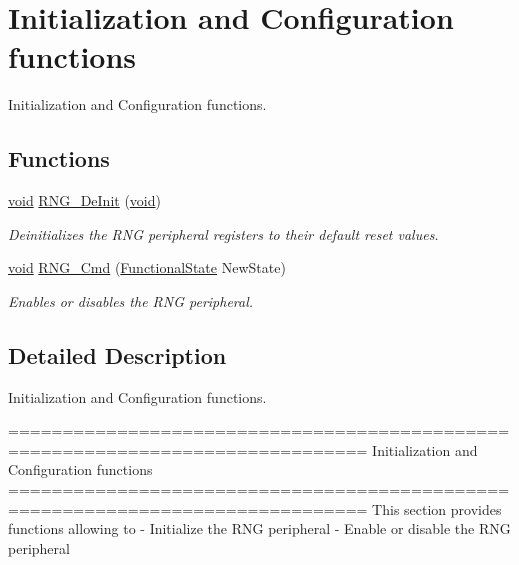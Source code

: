 \hypertarget{group___r_n_g___group1}{\section{Initialization and Configuration functions}
\label{group___r_n_g___group1}
}


Initialization and Configuration functions.  


\subsection*{Functions}
\begin{DoxyCompactItemize}
\item 
\hyperlink{group___n_a_m_e_ga18028b8badbf1ea7e704ccac3c488e82}{void} \hyperlink{group___r_n_g___group1_ga15ff5e649080076eebd51143b9ac4491}{R\-N\-G\-\_\-\-De\-Init} (\hyperlink{group___n_a_m_e_ga18028b8badbf1ea7e704ccac3c488e82}{void})
\begin{DoxyCompactList}\small\item\em Deinitializes the R\-N\-G peripheral registers to their default reset values. \end{DoxyCompactList}\item 
\hyperlink{group___n_a_m_e_ga18028b8badbf1ea7e704ccac3c488e82}{void} \hyperlink{group___r_n_g___group1_ga6c1a8372da6e8a06819903c63faecd7b}{R\-N\-G\-\_\-\-Cmd} (\hyperlink{group___exported__types_gac9a7e9a35d2513ec15c3b537aaa4fba1}{Functional\-State} New\-State)
\begin{DoxyCompactList}\small\item\em Enables or disables the R\-N\-G peripheral. \end{DoxyCompactList}\end{DoxyCompactItemize}


\subsection{Detailed Description}
Initialization and Configuration functions. \begin{DoxyVerb} ===============================================================================
                      Initialization and Configuration functions
 ===============================================================================  
  This section provides functions allowing to 
   - Initialize the RNG peripheral
   - Enable or disable the RNG peripheral\end{DoxyVerb}
 

